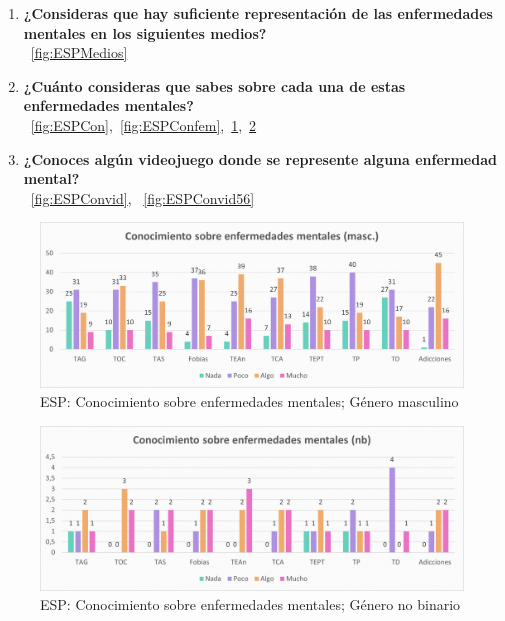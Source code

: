 \documentclass[12pt, a4paper,twoside,titlepage]{book}
\begin{document}
\begin{enumerate}[label=\textbf{\arabic*}.]
     \item \textbf{¿Consideras que hay suficiente representación de las enfermedades mentales en los siguientes medios? }\\
    ~\ref{fig:ESPMedios}
     \item \textbf{¿Cuánto consideras que sabes sobre cada una de estas enfermedades mentales? }\\
    ~\ref{fig:ESPCon},~\ref{fig:ESPConfem},~\ref{fig:ESPConmasc},~\ref{fig:ESPConnb}
     \item \textbf{¿Conoces algún videojuego donde se represente alguna enfermedad mental? }\\
    ~\ref{fig:ESPConvid},  ~\ref{fig:ESPConvid56}
\end{enumerate}



\begin{figure}
    \centering
    \includegraphics[width=1\linewidth]{ANEXO ESP/10AnexESPConmasc}
    \caption{ESP: Conocimiento sobre enfermedades mentales; Género masculino}
    \label{fig:ESPConmasc}
\end{figure}
\begin{figure}
    \centering
    \includegraphics[width=1\linewidth]{ANEXO ESP/11AnexESPConnb}
    \caption{ESP: Conocimiento sobre enfermedades mentales; Género no binario}
    \label{fig:ESPConnb}
\end{figure}
\end{document}
